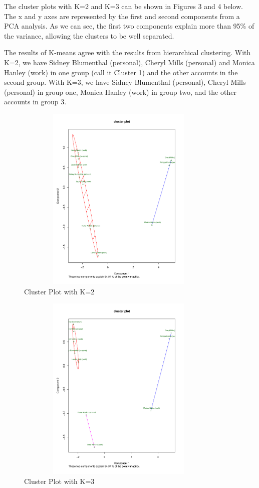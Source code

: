 The cluster plots with K=2 and K=3 can be shown in Figures 3 and 4 below. The x and y axes are represented by the first and second components from a PCA analysis. As we can see, the first two components explain more than 95\% of the variance, allowing the clusters to be well separated. 

The results of K-means agree with the results from hierarchical clustering. With K=2, we have Sidney Blumenthal (personal), Cheryl Mills (personal) and Monica Hanley (work) in one group (call it Cluster 1) and the other accounts in the second group. With K=3, we have Sidney Blumenthal (personal), Cheryl Mills (personal) in group one, Monica Hanley (work) in group two, and the other accounts in group 3.

\begin{figure}[h!]
    \centering
    \includegraphics[width=10cm,height=9cm]
    {daitong_and_yihe/c2.pdf}
    \caption{Cluster Plot with K=2}
\end{figure}

\begin{figure}[h!]
    \centering
    \includegraphics[width=10cm,height=9cm]
    {daitong_and_yihe/c3.pdf}
    \caption{Cluster Plot with K=3}
\end{figure}

